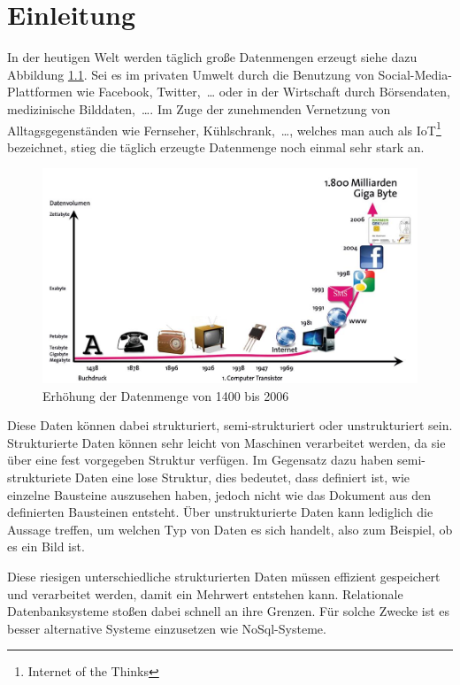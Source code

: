 \chapter{Einleitung}
In der heutigen Welt werden täglich große Datenmengen erzeugt siehe dazu
Abbildung \ref{fig:data-grow}. Sei es im privaten Umwelt durch die Benutzung
von Social-Media-Plattformen wie Facebook, Twitter,~\dots{} oder in der
Wirtschaft durch Börsendaten, medizinische Bilddaten,~\dots . Im Zuge der
zunehmenden Vernetzung von Alltagsgegenständen wie Fernseher,
Kühlschrank,~\dots{}, welches man auch als IoT\footnote{Internet of the Thinks}
bezeichnet, stieg die täglich erzeugte Datenmenge noch einmal sehr stark an.

\begin{figure}
\centering
\includegraphics[scale=0.375]{images/bitkom-lf-bigdata-2012-data_grow.jpg}
\caption{Erhöhung der Datenmenge von 1400 bis 2006 \cite{Weber2012}}
\label{fig:data-grow}
\end{figure}

Diese Daten können dabei strukturiert, semi-strukturiert oder unstrukturiert
sein. Strukturierte Daten können sehr leicht von Maschinen verarbeitet werden,
da sie über eine fest vorgegeben Struktur verfügen. Im Gegensatz dazu haben
semi-strukturiete Daten eine lose Struktur, dies bedeutet, dass definiert ist,
wie einzelne Bausteine auszusehen haben, jedoch nicht wie das Dokument aus den
definierten Bausteinen entsteht. Über unstrukturierte Daten kann lediglich die
Aussage treffen, um welchen Typ von Daten es sich handelt, also zum Beispiel,
ob es ein Bild ist.

Diese riesigen unterschiedliche strukturierten Daten müssen effizient
gespeichert und verarbeitet werden, damit ein Mehrwert entstehen kann.
Relationale Datenbanksysteme stoßen dabei schnell an ihre Grenzen. Für solche
Zwecke ist es besser alternative Systeme einzusetzen wie NoSql-Systeme.

